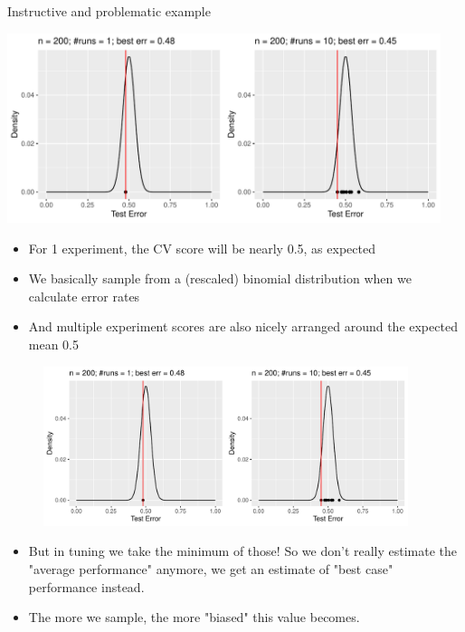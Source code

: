 \documentclass[11pt,compress,t,notes=noshow, xcolor=table]{beamer}
\begin{document}
\begin{vbframe}{Instructive and problematic example}
\begin{knitrout}\scriptsize
{}\color{fgcolor}

{\centering \includegraphics[width=0.95\textwidth]{figure/cart_tuning_nestintro_2} 

}


\end{knitrout}

\begin{itemize}
\item For 1 experiment, the CV score will be nearly 0.5, as expected
\item We basically sample from a (rescaled) binomial distribution when we calculate error rates
\item And multiple experiment scores are also nicely arranged around the expected mean 0.5
\end{itemize}

\framebreak

\begin{figure}
\centering 
\includegraphics[width=0.95\textwidth]{figure/cart_tuning_nestintro_2}
\end{figure}

\begin{itemize}
\item But in tuning we take the minimum of those! So we don't really estimate the "average performance" anymore, we get an estimate of "best case" performance instead.
\item The more we sample, the more "biased" this value becomes. 
\end{itemize}
\end{vbframe}
\end{document}
